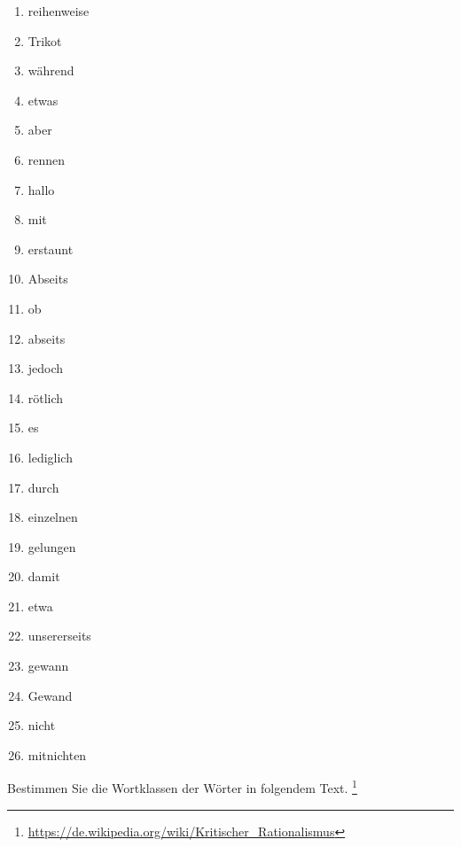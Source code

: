 \begin{enumerate}
  \item reihenweise
  \item Trikot
  \item während
  \item etwas
  \item aber
  \item rennen
  \item hallo
  \item mit
  \item erstaunt
  \item Abseits
  \item ob
  \item abseits
  \item jedoch
  \item rötlich
  \item es
  \item lediglich
  \item durch
  \item einzelnen
  \item gelungen
  \item damit
  \item etwa
  \item unsererseits
  \item gewann
  \item Gewand
  \item nicht
  \item mitnichten
\end{enumerate}

\Uebung{} \label{exc:wortklassen06} Bestimmen Sie die Wortklassen der Wörter in folgendem Text.%
\footnote{\url{https://de.wikipedia.org/wiki/Kritischer_Rationalismus}}

